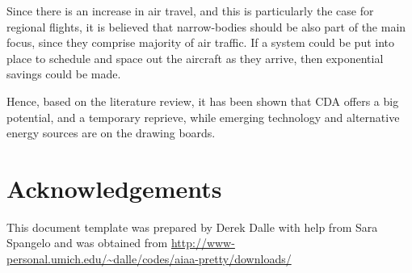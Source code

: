 \documentclass{aer1315-pretty}
\begin{document}
Since there is an increase in air travel, and this is particularly the case for regional flights, it is believed that narrow-bodies should be also part of the main focus, since they comprise majority of air traffic. If a system could be put into place to schedule and space out the aircraft as they arrive, then exponential savings could be made.\par

Hence, based on the literature review, it has been shown that CDA offers a big potential, and a temporary reprieve, while emerging technology and alternative energy sources are on the drawing boards.

                       



\section*{Acknowledgements}
This document template was prepared by Derek Dalle with help from Sara Spangelo and was obtained from \url{http://www-personal.umich.edu/~dalle/codes/aiaa-pretty/downloads/}  



\end{document}
